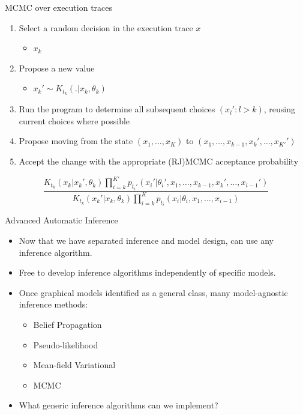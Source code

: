 \begin{frame}{MCMC over execution traces}
  \begin{enumerate}
    \item Select a random decision in the execution trace $x$
    \begin{itemize}
      \item{\eg $x_k$}
    \end{itemize}
    \vspace{\baselineskip}
    \item Propose a new value
    \begin{itemize}
      \item{\eg $x_k' \sim K_{t_k}(.|x_k,\theta_k)$}
    \end{itemize}
    \vspace{\baselineskip}
    \item Run the program to determine all subsequent choices $(x_l' : l > k)$, reusing current choices where possible
    \vspace{\baselineskip}
    \item Propose moving from the state $(x_1,\ldots,x_K)$ to $(x_1,\ldots,x_{k-1},x_k',\ldots,x_{K'}')$
    \vspace{\baselineskip}
    \item Accept the change with the appropriate (RJ)MCMC acceptance probability
  \end{enumerate}
  \begin{equation*}
    \frac{K_{t_k}(x_k|x_k',\theta_k)\prod_{i=k}^{K'} p_{t_i'}(x_i'|\theta_{i}',x_1,\ldots,x_{k-1},x_k',\ldots,x_{i-1}')}{K_{t_k}(x_k'|x_k,\theta_k)\prod_{i=k}^K p_{t_i}(x_i|\theta_{i},x_1,\ldots,x_{i-1})}
  \end{equation*}
\end{frame}


\begin{frame}{Advanced Automatic Inference}

    \begin{itemize}
      \item Now that we have separated inference and model design, can use any inference algorithm.
      \item Free to develop inference algorithms independently of specific models.
      \item Once graphical models identified as a general class, many model-agnostic inference methods:
      \begin{itemize}
	      \item Belief Propagation
	      \item Pseudo-likelihood
	      \item Mean-field Variational
	      \item MCMC
	    \end{itemize}
    \item What generic inference algorithms can we implement?
    \end{itemize}
\end{frame}


